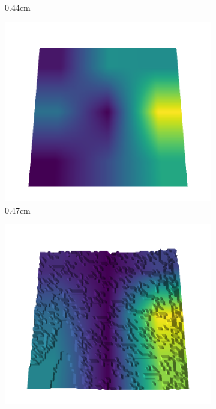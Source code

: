 \begin{figure}[H]
\begin{subfigure}[b]{0.192\linewidth}
    \caption{0.44cm}
    \label{fig : quarry-best-6}
    \end{subfigure}
    \begin{subfigure}[b]{0.192\linewidth}
    \includegraphics[width=\linewidth]{../img/5/quarry/best/46-patch-3d-majavi-colormap-70.png}
    \caption{0.47cm}
    \label{fig : quarry-best-7}
    \end{subfigure}
    \begin{subfigure}[b]{0.192\linewidth}
    \includegraphics[width=\linewidth]{../img/5/quarry/best/49-patch-3d-majavi-colormap-80.png}

\end{subfigure}
\end{figure}
